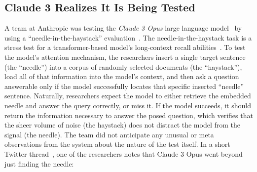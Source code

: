 \subsection{Claude 3 Realizes It Is Being Tested~\citep{claude3tweet}}

\label{sec:claudeneedle}

A team at Anthropic was testing the \emph{Claude 3 Opus} large language model~\citep{claude3family} by using a ``needle-in-the-haystack'' evaluation~\citep{Kamradt2023Needle}.
The needle-in-the-haystack task is a stress test for a transformer-based model's long-context recall abilities~\citep{vaswani2023attentionneed}.
To test the model's attention mechanism, the researchers insert a single target sentence (the ``needle'') into a corpus of randomly selected documents (the ``haystack''), load all of that information into the model's context, and then ask a question answerable only if the model successfully locates that specific inserted ``needle'' sentence.
Naturally, researchers expect the model to either retrieve the embedded needle and answer the query correctly, or miss it. 
If the model succeeds, it should return the information necessary to answer the posed question, which verifies that the sheer volume of noise (the haystack) does not distract the model from the signal (the needle).
The team did not anticipate any unusual or meta observations from the system about the nature of the test itself.
In a short Twitter thread~\citep{claude3tweet}, one of the researchers notes that Claude 3 Opus went beyond just finding the needle:

